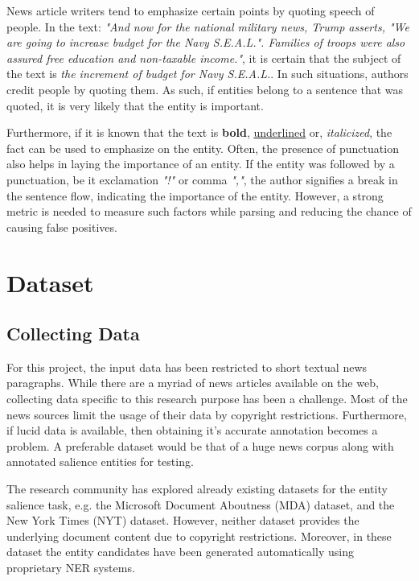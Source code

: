 \documentclass{article}
\begin{document}
		 
		News article writers tend to emphasize certain points by quoting speech of people. In the text: \textit{"And now for the national military news, Trump asserts, "We are going to increase budget for the Navy S.E.A.L.". Families of troops were also assured free education and non-taxable income."}, it is certain that the subject of the text is \textit{the increment of budget for Navy S.E.A.L.}. In such situations, authors credit people by quoting them. As such, if entities belong to a sentence that was quoted, it is very likely that the entity is important.
		
		Furthermore, if it is known that the text is \textbf{bold}, \underline{underlined} or, \textit{italicized}, the fact can be used to emphasize on the entity. Often, the presence of punctuation also helps in laying the importance of an entity. If the entity was followed by a punctuation, be it exclamation \textit{"!"} or comma \textit{","}, the author signifies a break in the sentence flow, indicating the importance of the entity. However, a strong metric is needed to measure such factors while parsing and reducing the chance of causing false positives.  
		
	\section{Dataset}
	\subsection{Collecting Data}
		For this project, the input data has been restricted to short textual news paragraphs. While there are a myriad of news articles available on the web, collecting data specific to this research purpose has been a challenge. Most of the news sources limit the usage of their data by copyright restrictions. Furthermore, if lucid data is available, then obtaining it's accurate annotation becomes a problem. A preferable dataset would be that of a huge news corpus along with annotated salience entities for testing.
		
		The research community has explored  already existing datasets for the entity salience task, e.g. the Microsoft Document  Aboutness (MDA) dataset, and the New York Times (NYT) dataset. However, neither dataset provides the underlying document content due to copyright restrictions.  Moreover, in these dataset the entity  candidates have been generated  automatically using proprietary NER systems. \cite{crowdsourced_corpus}
	
\end{document}
